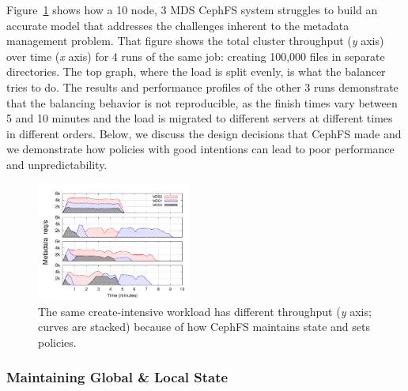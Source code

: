 Figure~\ref{figure:creates-thruput} shows how a 10 node, 3 MDS CephFS system struggles to build an accurate model that addresses the challenges inherent to the metadata management problem. That figure shows the total cluster throughput ({\it y} axis) over time ({\it x} axis) for 4 runs of the same job: creating 100,000 files in separate directories. The top graph, where the load is split evenly, is what the balancer tries to do. The results and performance profiles of the other 3 runs demonstrate that the balancing behavior is not reproducible, as the finish times vary between 5 and 10 minutes and the load is migrated to different servers at different times in different orders. Below, we discuss the design decisions that CephFS made and we demonstrate how policies with good intentions can lead to poor performance and unpredictability.

\begin{figure}[tb]
	\includegraphics[width=0.45\textwidth]{./chapters/mantle/figures/creates-thruput-runs2.pdf}
	\caption{The same create-intensive workload has different throughput ({\it y} axis; curves are stacked) because of how CephFS maintains state and sets policies.\label{figure:creates-thruput}}
\end{figure}
\subsubsection{Maintaining Global \& Local State}
\label{the-challenge-in-maintaining_global_local_state}

